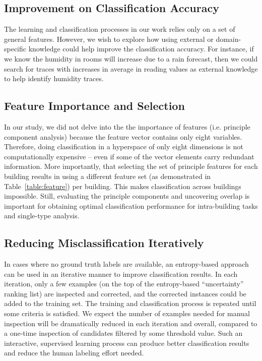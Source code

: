 \subsection{Improvement on Classification Accuracy}
The learning and classification processes in our work relies only on a set of general features. However, we wish to explore how using external or domain-specific knowledge could help improve the classification accuracy. For instance, if we know the humidity in rooms will increase due to a rain forecast, then we could search for traces with increases in average in reading values as external knowledge to help identify humidity traces. 

\subsection{Feature Importance and Selection}
In our study, we did not delve into the the importance of features (i.e. principle component analysis) 
because the feature vector contains only eight variables.  Therefore, doing classification in a hyperspace of only eight dimensions 
is not computationally expensive -- even if some of the vector elements carry redundant information. More importantly, 
that selecting the set of principle features for each building results in using a different feature set 
(as demonstrated in Table~\ref{table:feature}) per building.  This makes classification across buildings impossible. Still, 
evaluating the principle components and uncovering overlap is
important for obtaining optimal classification performance for intra-building tasks and single-type analysis.

\subsection{Reducing Misclassification Iteratively}
In cases where no ground truth labels are available, an entropy-based approach can be used in an iterative manner to improve classification results. 
In each iteration, 
only a few examples (on the top of the entropy-based ``uncertainty'' ranking list) are inspected and corrected, and the corrected instances could be
 added to the training set.  The training 
and classification process is repeated until some criteria is satisfied. We expect the number of examples needed for manual inspection 
will be dramatically reduced in each iteration and overall, compared to a one-time inspection of candidates filtered by some threshold value.
Such an interactive, supervised learning process can produce better classification results and reduce the human labeling effort needed.
